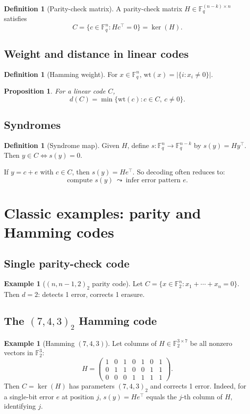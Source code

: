 \documentclass[11pt]{article}
\newtheorem{proposition}[theorem]{Proposition}
\theoremstyle{definition}
\newtheorem{definition}[theorem]{Definition}
\newtheorem{example}[theorem]{Example}
\theoremstyle{remark}
\newcommand{\F}{\mathbb{F}}
\newcommand{\wt}{\mathrm{wt}}
\begin{document}
	\begin{definition}[Parity-check matrix]
		A parity-check matrix \(H\in \F_q^{(n-k)\times n}\) satisfies
		\[
		C=\{c\in \F_q^n: Hc^\top=0\}=\ker(H).
		\]
	\end{definition}
	
	\subsection{Weight and distance in linear codes}
	\begin{definition}[Hamming weight]
		For \(x\in \F_q^n\), \(\wt(x)=|\{i: x_i\neq 0\}|\).
	\end{definition}
	
	\begin{proposition}
		For a linear code \(C\),
		\[
		d(C)=\min\{\wt(c): c\in C,\ c\neq 0\}.
		\]
	\end{proposition}
	
	\subsection{Syndromes}
	\begin{definition}[Syndrome map]
		Given \(H\), define \(s:\F_q^n\to \F_q^{n-k}\) by \(s(y)=Hy^\top\).
		Then \(y\in C\iff s(y)=0\).
	\end{definition}
	
	If \(y=c+e\) with \(c\in C\), then \(s(y)=He^\top\). So decoding often reduces to:
	\[
	\text{compute }s(y)\ \leadsto\ \text{infer error pattern }e.
	\]
	
	\section{Classic examples: parity and Hamming codes}
	\subsection{Single parity-check code}
	\begin{example}[\((n,n-1,2)_2\) parity code]
		Let \(C=\{x\in \F_2^n: x_1+\cdots+x_n=0\}\).
		Then \(d=2\): detects 1 error, corrects 1 erasure.
	\end{example}
	
	\subsection{The \((7,4,3)_2\) Hamming code}
	\begin{example}[Hamming \((7,4,3)\)]
		Let columns of \(H\in \F_2^{3\times 7}\) be all nonzero vectors in \(\F_2^3\):
		\[
		H=\begin{pmatrix}
			1&0&1&0&1&0&1\\
			0&1&1&0&0&1&1\\
			0&0&0&1&1&1&1
		\end{pmatrix}.
		\]
		Then \(C=\ker(H)\) has parameters \((7,4,3)_2\) and corrects 1 error.
		Indeed, for a single-bit error \(e\) at position \(j\), \(s(y)=He^\top\) equals the \(j\)-th column of \(H\), identifying \(j\).
	\end{example}
	
\end{document}

